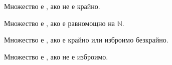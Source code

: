 \begin{definition}
    Множество е , ако не е крайно.
\end{definition}

\begin{definition}
    Множество е , ако е равномощно на \(\mathbb{N}\).
\end{definition}

\begin{definition}
    Множество е , ако е крайно или изброимо безкрайно.
\end{definition}

\begin{definition}
    Множество е , ако не е изброимо.
\end{definition}

